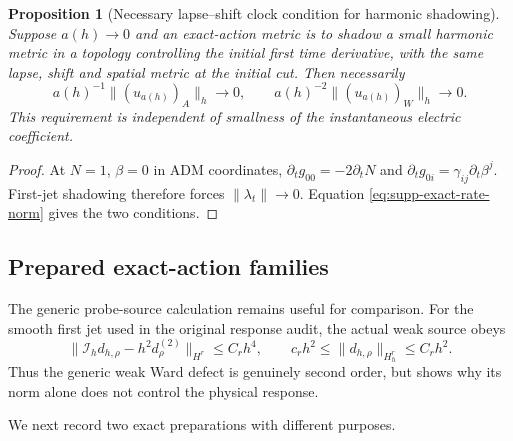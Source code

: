 \documentclass[11pt]{article}
\newtheorem{proposition}[proposition]{Proposition}
\theoremstyle{definition}
\theoremstyle{remark}
\begin{document}
\begin{proposition}[Necessary lapse--shift clock condition for harmonic shadowing]
\label{prop:supp-exact-clock-test}
Suppose $a(h)\to0$ and an exact-action metric is to shadow a small harmonic
metric in a topology controlling the initial first time derivative, with the
same lapse, shift and spatial metric at the initial cut.  Then necessarily
\begin{equation}
 \boxed{a(h)^{-1}\|(u_{a(h)})_A\|_h\to0,
 \qquad a(h)^{-2}\|(u_{a(h)})_W\|_h\to0.}
 \label{eq:supp-exact-rate-necessary}
\end{equation}
This requirement is independent of smallness of the instantaneous electric
coefficient.
\end{proposition}
\begin{proof}
At $N=1$, $\beta=0$ in ADM coordinates,
$\partial_tg_{00}=-2\partial_tN$ and
$\partial_tg_{0i}=\gamma_{ij}\partial_t\beta^j$.  First-jet shadowing
therefore forces $\|\lambda_t\|\to0$.  Equation
\eqref{eq:supp-exact-rate-norm} gives the two conditions.
\end{proof}

\subsection{Prepared exact-action families}

The generic probe-source calculation remains useful for comparison.  For the
smooth first jet used in the original response audit, the actual weak source
obeys
\begin{equation}
 \|\mathcal I_hd_{h,\rho}-h^2d_\rho^{(2)}\|_{H^r}\le C_rh^4,
 \qquad c_rh^2\le\|d_{h,\rho}\|_{H_h^r}\le C_rh^2.
 \label{eq:supp-exact-source-expansion}
\end{equation}
Thus the generic weak Ward defect is genuinely second order, but
 shows why its norm alone does not
control the physical response.

We next record two exact preparations with different purposes.
\end{document}
